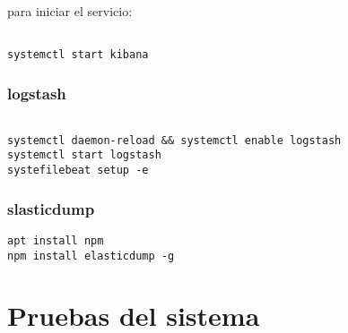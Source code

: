  para iniciar el servicio:
 
\begin{lstlisting}[frame=single] 

systemctl start kibana
\end{lstlisting}

\subsubsection{logstash}

\begin{lstlisting}[frame=single] 

systemctl daemon-reload && systemctl enable logstash
systemctl start logstash
systefilebeat setup -e

\end{lstlisting}

\subsubsection{slasticdump}

\begin{lstlisting}[frame=single] 
apt install npm
npm install elasticdump -g
\end{lstlisting}

\section{Pruebas del sistema}


